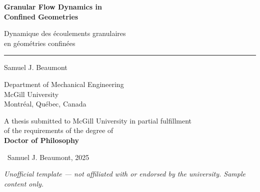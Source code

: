 \documentclass[12pt,letterpaper,twoside]{report}
\begin{document}
\begin{titlepage}
\thispagestyle{empty}
\begin{center}

\vspace*{1.5cm}

{\Huge\bfseries\color{mcgillnavy}Granular Flow Dynamics in\\Confined Geometries}

\vspace{8pt}

{\huge\color{mcgillnavy}Dynamique des \'ecoulements granulaires\\en g\'eom\'etries confin\'ees}

\vspace{18pt}

{\color{mcgillred}\rule{0.55\textwidth}{1.8pt}}

\vspace{24pt}

{\Large\color{mcgillnavy}Samuel J. Beaumont}

\vspace{16pt}

{\normalsize\color{mcgillnavy}
Department of Mechanical Engineering\\
McGill University\\
Montr\'eal, Qu\'ebec, Canada
}

\vspace{20pt}

{\normalsize\color{mcgillnavy}
A thesis submitted to McGill University in partial fulfillment\\
of the requirements of the degree of\\
\vspace{4pt}
\textbf{Doctor of Philosophy}
}

\vspace{18pt}

{\normalsize\color{mcgillnavy}\textcopyright\ Samuel J. Beaumont, 2025}

\vfill

{\footnotesize\color{mcgillnavy!60}
\textit{Unofficial template --- not affiliated with or endorsed by the university. Sample content only.}
}

\vspace{0.8cm}
\end{center}
\end{titlepage}



















\end{document}
